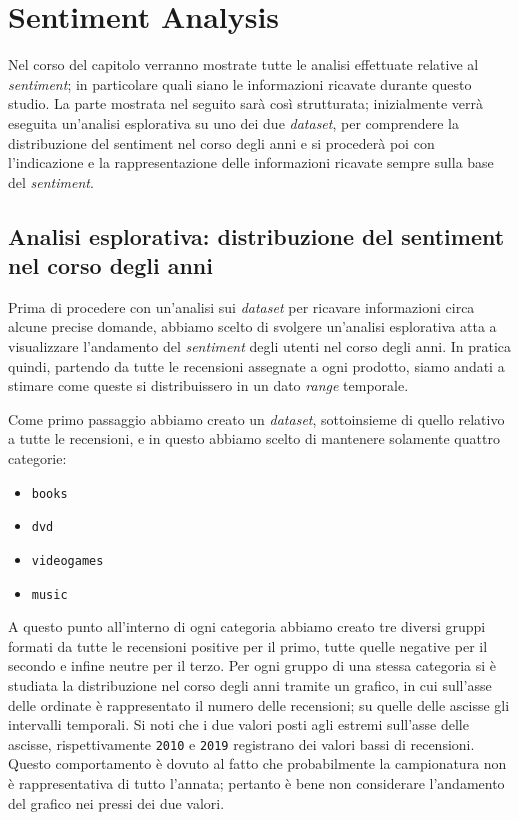 \chapter{Sentiment Analysis}   
\label{cap:SentimentAnalysis}
	Nel corso del capitolo verranno mostrate tutte le analisi effettuate relative al \textit{sentiment}; in particolare quali siano le informazioni ricavate durante questo studio. La parte mostrata nel seguito sarà così strutturata; inizialmente verrà eseguita un'analisi esplorativa su uno dei due \textit{dataset}, per comprendere la distribuzione del sentiment nel corso degli anni e si procederà poi con l'indicazione e la rappresentazione delle informazioni ricavate sempre sulla base del \textit{sentiment}.
	
	\section{Analisi esplorativa: distribuzione del sentiment nel corso degli anni}
		Prima di procedere con un'analisi sui \textit{dataset} per ricavare informazioni circa alcune precise domande, abbiamo scelto di svolgere un'analisi esplorativa atta a visualizzare l'andamento del \textit{sentiment} degli utenti nel corso degli anni. In pratica quindi, partendo da tutte le recensioni assegnate a ogni prodotto, siamo andati a stimare come queste si distribuissero in un dato \textit{range} temporale. 
		
		Come primo passaggio abbiamo creato un \textit{dataset}, sottoinsieme di quello relativo a tutte le recensioni, e in questo abbiamo scelto di mantenere solamente quattro categorie:
		\begin{itemize}
			\item \texttt{books}
			\item \texttt{dvd}
			\item \texttt{videogames}
			\item \texttt{music}
		\end{itemize}
		
		A questo punto all'interno di ogni categoria abbiamo creato tre diversi gruppi formati da tutte le recensioni positive per il primo, tutte quelle negative per il secondo e infine neutre per il terzo. Per ogni gruppo di una stessa categoria si è studiata la distribuzione nel corso degli anni tramite un grafico, in cui sull'asse delle ordinate è rappresentato il numero delle recensioni; su quelle delle ascisse gli intervalli temporali. Si noti che i due valori posti agli estremi sull'asse delle ascisse, rispettivamente \verb|2010| e \verb|2019| registrano dei valori bassi di recensioni. Questo comportamento è dovuto al fatto che probabilmente la campionatura non è rappresentativa di tutto l'annata; pertanto è bene non considerare l'andamento del grafico nei pressi dei due valori.
		

